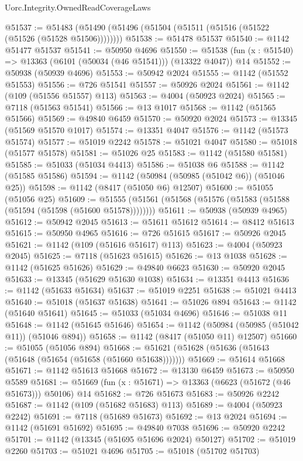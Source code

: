 \begin{lexlean}{Uorc.Integrity.OwnedReadCoverageLaws}
\begin{coremodule}
@51537 := @51483 (@51490 (@51496 (@51504 (@51511 (@51516 (@51522 (@51526 (@51528 @51506))))))))
@51538 := @51478 @51537
@51540 := @1142 @51477 @51537
@51541 := @50950 @4696
@51550 := @51538 (fun (x : @51540) => @13363 (@6101 (@50034 (@46 @51541))) (@13322 @4047)) @14
@51552 := @50938 (@50939 @4696)
@51553 := @50942 @2024
@51555 := @1142 (@51552 @51553)
@51556 := @726 @51541
@51557 := @50926 @2024
@51561 := @1142 (@109 (@51556 @51557) @113)
@51563 := @4004 (@50923 @2024)
@51565 := @7118 (@51563 @51541)
@51566 := @13 @1017
@51568 := @1142 (@51565 @51566)
@51569 := @49840 @6459
@51570 := @50920 @2024
@51573 := @13345 (@51569 @51570 @1017)
@51574 := @13351 @4047
@51576 := @1142 (@51573 @51574)
@51577 := @51019 @2242
@51578 := @51021 @4047
@51580 := @51018 (@51577 @51578)
@51581 := @51026 @25
@51583 := @1142 (@51580 @51581)
@51585 := @51033 (@51034 @4413)
@51586 := @51038 @6
@51588 := @1142 (@51585 @51586)
@51594 := @1142 (@50984 (@50985 (@51042 @6)) (@51046 @25))
@51598 := @1142 (@8417 (@51050 @6) @12507)
@51600 := @51055 (@51056 @25)
@51609 := @51555 (@51561 (@51568 (@51576 (@51583 (@51588 (@51594 (@51598 (@51600 @51578))))))))
@51611 := @50938 (@50939 @4965)
@51612 := @50942 @2045
@51613 := @51611 @51612
@51614 := @8412 @51613
@51615 := @50950 @4965
@51616 := @726 @51615
@51617 := @50926 @2045
@51621 := @1142 (@109 (@51616 @51617) @113)
@51623 := @4004 (@50923 @2045)
@51625 := @7118 (@51623 @51615)
@51626 := @13 @1038
@51628 := @1142 (@51625 @51626)
@51629 := @49840 @6623
@51630 := @50920 @2045
@51633 := @13345 (@51629 @51630 @1038)
@51634 := @13351 @4413
@51636 := @1142 (@51633 @51634)
@51637 := @51019 @2251
@51638 := @51021 @4413
@51640 := @51018 (@51637 @51638)
@51641 := @51026 @894
@51643 := @1142 (@51640 @51641)
@51645 := @51033 (@51034 @4696)
@51646 := @51038 @11
@51648 := @1142 (@51645 @51646)
@51654 := @1142 (@50984 (@50985 (@51042 @11)) (@51046 @894))
@51658 := @1142 (@8417 (@51050 @11) @12507)
@51660 := @51055 (@51056 @894)
@51668 := @51621 (@51628 (@51636 (@51643 (@51648 (@51654 (@51658 (@51660 @51638)))))))
@51669 := @51614 @51668
@51671 := @1142 @51613 @51668
@51672 := @13130 @6459
@51673 := @50950 @5589
@51681 := @51669 (fun (x : @51671) => @13363 (@6623 (@51672 (@46 @51673))) @50106) @14
@51682 := @726 @51673
@51683 := @50926 @2242
@51687 := @1142 (@109 (@51682 @51683) @113)
@51689 := @4004 (@50923 @2242)
@51691 := @7118 (@51689 @51673)
@51692 := @13 @2024
@51694 := @1142 (@51691 @51692)
@51695 := @49840 @7038
@51696 := @50920 @2242
@51701 := @1142 (@13345 (@51695 @51696 @2024) @50127)
@51702 := @51019 @2260
@51703 := @51021 @4696
@51705 := @51018 (@51702 @51703)

\end{coremodule}
\end{lexlean}
